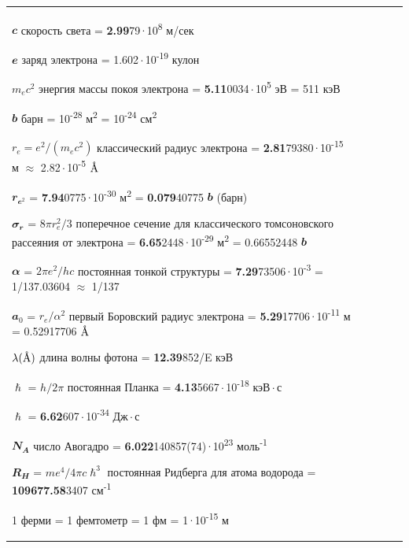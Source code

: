 \documentclass[a4paper,14pt, openany, twoside, draft]{extbook} %
\newcommand{\AAA}{\textup{\AA}}
\begin{document}
\begin{flushleft}
\begin{supertabular}{|m{1.7279999cm}|m{1.522cm}|m{1.522cm}|m{1.522cm}|m{1.744cm}|}

$\mathbfit{c}$  скорость света =  \textbf{2.99}79\,$\cdot$\,10\textsuperscript{8} м/сек %

$\mathbfit{e}$  заряд электрона = 1.602\,$\cdot$\,10\textsuperscript{-19} кулон

$m_ec^2$  энергия массы покоя электрона = \textbf{5.11}0034\,$\cdot$\,10\textsuperscript{5} эВ = 511 кэВ

$\mathbfit{b}$  барн = 10\textsuperscript{-28} м\textsuperscript{2} = 10\textsuperscript{-24} см\textsuperscript{2}

$r_e=e^2/(m_ec^2)$  классический радиус электрона = \textbf{2.81}79380\,$\cdot$\,10\textsuperscript{-15} м $\approx$ 2.82\,$\cdot$\,10\textsuperscript{-5} $\AAA$

$\mathbfit{r_{e^2}}$ = \textbf{7.94}0775\,$\cdot$\,10\textsuperscript{-30} м\textsuperscript{2}  = \textbf{0.079}40775 $\mathbfit{b}$ (барн)

$\mathbfit{\sigma_r}$ = $8\pi r_e^2/3$ поперечное сечение для классического томсоновского рассеяния от электрона = \textbf{6.65}2448\,$\cdot$\,10\textsuperscript{-29} м\textsuperscript{2} = 0.66552448 $\mathbfit{b}$

$\mathbfit{\alpha}$ = $2\pi e^2/hc$ постоянная тонкой структуры = \textbf{7.29}73506\,$\cdot$\,10\textsuperscript{-3} = 1/137.03604 $\approx$ 1/137

$\mathbfit{a_0}$ = $r_e/\alpha^2$ первый Боровский радиус электрона  = \textbf{5.29}17706\,$\cdot$\,10\textsuperscript{-11} м = 0.52917706 $\AAA$

$\lambda(\AAA)$  длина волны фотона = \textbf{12.39}852/E кэВ

$\mathbfit{\hslash}$ = $h/2\pi$ постоянная Планка = \textbf{4.13}5667\,$\cdot$\,10\textsuperscript{-18} кэВ\,$\cdot$\,с

$\mathbfit{\hslash}$ = \textbf{6.62}607\,$\cdot$\,10\textsuperscript{-34} Дж\,$\cdot$\,с

$\mathbfit{N_A}$  число Авогадро = \textbf{6.022}140857(74)\,$\cdot$\,10\textsuperscript{23} моль\textsuperscript{-1}

$\mathbfit{R_H}$ = $me^4/4\pi c\hslash^3$ постоянная Ридберга для атома водорода = \textbf{109677.58}3407 см\textsuperscript{-1}

1 ферми = 1 фемтометр = 1 фм = 1\,$\cdot$\,10\textsuperscript{-15} м


\end{supertabular}
\end{flushleft}
\end{document}
